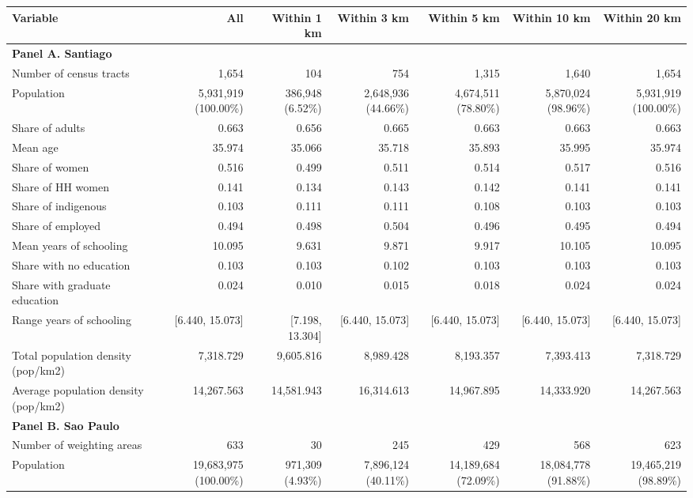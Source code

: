 \begin{tabular}{lrrrrrr}
    \midrule
    \midrule
    \textbf{Variable} & \textbf{All} & \textbf{Within 1 km} & \textbf{Within 3 km} & \textbf{Within 5 km} & \textbf{Within 10 km} & \textbf{Within 20 km} \\
    \midrule
    \multicolumn{7}{l}{\textbf{Panel A. Santiago}} \\
    \midrule
    Number of census tracts & 1,654 & 104 & 754 & 1,315 & 1,640 & 1,654 \\
    Population & 5,931,919 (100.00\%) & 386,948 (6.52\%) & 2,648,936 (44.66\%) & 4,674,511 (78.80\%) & 5,870,024 (98.96\%) & 5,931,919 (100.00\%) \\
    Share of adults & 0.663 & 0.656 & 0.665 & 0.663 & 0.663 & 0.663 \\
    Mean age & 35.974 & 35.066 & 35.718 & 35.893 & 35.995 & 35.974 \\
    Share of women & 0.516 & 0.499 & 0.511 & 0.514 & 0.517 & 0.516 \\
    Share of HH women & 0.141 & 0.134 & 0.143 & 0.142 & 0.141 & 0.141 \\
    Share of indigenous & 0.103 & 0.111 & 0.111 & 0.108 & 0.103 & 0.103 \\
    Share of employed & 0.494 & 0.498 & 0.504 & 0.496 & 0.495 & 0.494 \\
    Mean years of schooling & 10.095 & 9.631 & 9.871 & 9.917 & 10.105 & 10.095 \\
    Share with no education & 0.103 & 0.103 & 0.102 & 0.103 & 0.103 & 0.103 \\
    Share with graduate education & 0.024 & 0.010 & 0.015 & 0.018 & 0.024 & 0.024 \\
    Range years of schooling & [6.440, 15.073] & [7.198, 13.304] & [6.440, 15.073] & [6.440, 15.073] & [6.440, 15.073] & [6.440, 15.073] \\
    Total population density (pop/km2) & 7,318.729 & 9,605.816 & 8,989.428 & 8,193.357 & 7,393.413 & 7,318.729 \\
    Average population density (pop/km2) & 14,267.563 & 14,581.943 & 16,314.613 & 14,967.895 & 14,333.920 & 14,267.563 \\
    \midrule
    \multicolumn{7}{l}{\textbf{Panel B. Sao Paulo}} \\
    \midrule
    Number of weighting areas & 633 & 30 & 245 & 429 & 568 & 623 \\
    Population & 19,683,975 (100.00\%) & 971,309 (4.93\%) & 7,896,124 (40.11\%) & 14,189,684 (72.09\%) & 18,084,778 (91.88\%) & 19,465,219 (98.89\%) \\

\end{tabular}
